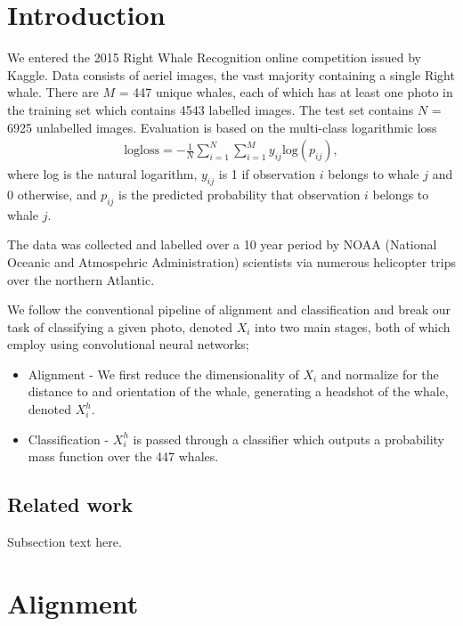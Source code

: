 \documentclass{IET}%
\begin{document}
\section{Introduction}
We entered the 2015 Right Whale Recognition online competition issued by Kaggle. Data consists of aeriel images, the vast majority containing a single Right whale. There are $M$ = 447 unique whales, each of which has at least one photo in the training set which contains 4543 labelled images. The test set contains $N$ = 6925 unlabelled images. Evaluation is based on the multi-class logarithmic loss
\begin{eqnarray}
\text{logloss} = - \frac{1}{N} \sum_{i=1}^{N} \sum_{i=1}^{M} y_{ij} \text{log}(p_{ij}),
\end{eqnarray}
where log is the natural logarithm, $y_{ij}$ is 1 if observation $i$ belongs to whale $j$ and 0 otherwise, and $p_{ij}$ is the predicted probability that observation $i$ belongs to whale $j$. 

The data was collected and labelled over a 10 year period by NOAA (National Oceanic and Atmospehric Administration) scientists via numerous helicopter trips over the northern Atlantic. 

We follow the conventional pipeline of alignment and classification and break our task of classifying a given photo, denoted $X_i$ into two main stages, both of which employ using convolutional neural networks;
\begin{itemize}
\item Alignment - We first reduce the dimensionality of $X_i$ and normalize for the distance to and orientation of the whale, generating a headshot of the whale, denoted $X_i^h$.
\item Classification - $X_i^h$ is passed through a classifier which outputs a probability mass function over the 447 whales.
\end{itemize}

\subsection{Related work}
Subsection text here.

\section{Alignment}
\end{document}
